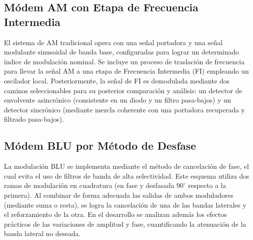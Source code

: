 \subsection{Módem AM con Etapa de Frecuencia Intermedia}
El sistema de AM tradicional opera con una señal portadora y una señal modulante sinusoidal de banda base, configuradas para lograr un determinado índice de modulación nominal. Se incluye un proceso de traslación de frecuencia para llevar la señal AM a una etapa de Frecuencia Intermedia (FI) empleando un oscilador local. Posteriormente, la señal de FI es demodulada mediante dos caminos seleccionables para su posterior comparación y análisis: un detector de envolvente asincrónico (consistente en un diodo y un filtro pasa-bajos) y un detector sincrónico (mediante mezcla coherente con una portadora recuperada y filtrado pasa-bajos).

\subsection{Módem BLU por Método de Desfase}
La modulación BLU se implementa mediante el método de cancelación de fase, el cual evita el uso de filtros de banda de alta selectividad. Este esquema utiliza dos ramas de modulación en cuadratura (en fase y desfasada $90^\circ$ respecto a la primera). Al combinar de forma adecuada las salidas de ambos moduladores (mediante suma o resta), se logra la cancelación de una de las bandas laterales y el reforzamiento de la otra. En el desarrollo se analizan además los efectos prácticos de las variaciones de amplitud y fase, cuantificando la atenuación de la banda lateral no deseada.

